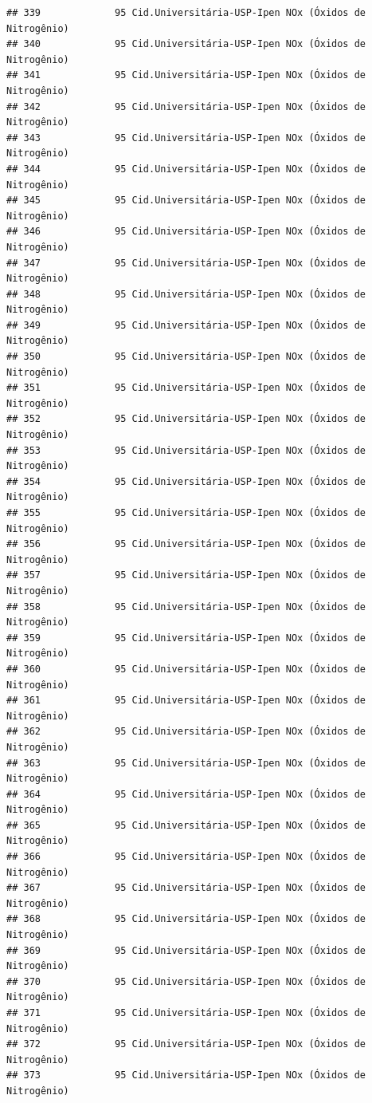 \documentclass[]{book}
\begin{document}
\begin{verbatim}
## 339             95 Cid.Universitária-USP-Ipen NOx (Óxidos de Nitrogênio)
## 340             95 Cid.Universitária-USP-Ipen NOx (Óxidos de Nitrogênio)
## 341             95 Cid.Universitária-USP-Ipen NOx (Óxidos de Nitrogênio)
## 342             95 Cid.Universitária-USP-Ipen NOx (Óxidos de Nitrogênio)
## 343             95 Cid.Universitária-USP-Ipen NOx (Óxidos de Nitrogênio)
## 344             95 Cid.Universitária-USP-Ipen NOx (Óxidos de Nitrogênio)
## 345             95 Cid.Universitária-USP-Ipen NOx (Óxidos de Nitrogênio)
## 346             95 Cid.Universitária-USP-Ipen NOx (Óxidos de Nitrogênio)
## 347             95 Cid.Universitária-USP-Ipen NOx (Óxidos de Nitrogênio)
## 348             95 Cid.Universitária-USP-Ipen NOx (Óxidos de Nitrogênio)
## 349             95 Cid.Universitária-USP-Ipen NOx (Óxidos de Nitrogênio)
## 350             95 Cid.Universitária-USP-Ipen NOx (Óxidos de Nitrogênio)
## 351             95 Cid.Universitária-USP-Ipen NOx (Óxidos de Nitrogênio)
## 352             95 Cid.Universitária-USP-Ipen NOx (Óxidos de Nitrogênio)
## 353             95 Cid.Universitária-USP-Ipen NOx (Óxidos de Nitrogênio)
## 354             95 Cid.Universitária-USP-Ipen NOx (Óxidos de Nitrogênio)
## 355             95 Cid.Universitária-USP-Ipen NOx (Óxidos de Nitrogênio)
## 356             95 Cid.Universitária-USP-Ipen NOx (Óxidos de Nitrogênio)
## 357             95 Cid.Universitária-USP-Ipen NOx (Óxidos de Nitrogênio)
## 358             95 Cid.Universitária-USP-Ipen NOx (Óxidos de Nitrogênio)
## 359             95 Cid.Universitária-USP-Ipen NOx (Óxidos de Nitrogênio)
## 360             95 Cid.Universitária-USP-Ipen NOx (Óxidos de Nitrogênio)
## 361             95 Cid.Universitária-USP-Ipen NOx (Óxidos de Nitrogênio)
## 362             95 Cid.Universitária-USP-Ipen NOx (Óxidos de Nitrogênio)
## 363             95 Cid.Universitária-USP-Ipen NOx (Óxidos de Nitrogênio)
## 364             95 Cid.Universitária-USP-Ipen NOx (Óxidos de Nitrogênio)
## 365             95 Cid.Universitária-USP-Ipen NOx (Óxidos de Nitrogênio)
## 366             95 Cid.Universitária-USP-Ipen NOx (Óxidos de Nitrogênio)
## 367             95 Cid.Universitária-USP-Ipen NOx (Óxidos de Nitrogênio)
## 368             95 Cid.Universitária-USP-Ipen NOx (Óxidos de Nitrogênio)
## 369             95 Cid.Universitária-USP-Ipen NOx (Óxidos de Nitrogênio)
## 370             95 Cid.Universitária-USP-Ipen NOx (Óxidos de Nitrogênio)
## 371             95 Cid.Universitária-USP-Ipen NOx (Óxidos de Nitrogênio)
## 372             95 Cid.Universitária-USP-Ipen NOx (Óxidos de Nitrogênio)
## 373             95 Cid.Universitária-USP-Ipen NOx (Óxidos de Nitrogênio)

\end{verbatim}
\end{document}
